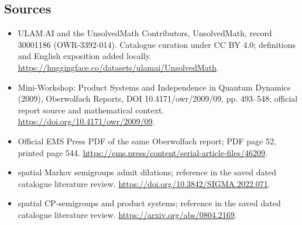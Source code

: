 \documentclass[11pt]{article}
\begin{document}
\subsection{Sources}
\begin{itemize}
\item[\hypertarget{source:30001186:1}{S1}] ULAM.AI and the UnsolvedMath Contributors, UnsolvedMath, record 30001186 (OWR-3392-014). Catalogue curation under CC BY 4.0; definitions and English exposition added locally.
\url{https://huggingface.co/datasets/ulamai/UnsolvedMath}.
\item[\hypertarget{source:30001186:2}{S2}] Mini-Workshop: Product Systems and Independence in Quantum Dynamics (2009), Oberwolfach Reports, DOI 10.4171/owr/2009/09, pp. 493--548; official report source and mathematical context.
\url{https://doi.org/10.4171/owr/2009/09}.
\item[\hypertarget{source:30001186:3}{S3}] Official EMS Press PDF of the same Oberwolfach report; PDF page 52, printed page 544.
\url{https://ems.press/content/serial-article-files/46209}.
\item[\hypertarget{source:30001186:4}{S4}] spatial Markov semigroups admit dilations; reference in the saved dated catalogue literature review.
\url{https://doi.org/10.3842/SIGMA.2022.071}.
\item[\hypertarget{source:30001186:5}{S5}] spatial CP-semigroups and product systems; reference in the saved dated catalogue literature review.
\url{https://arxiv.org/abs/0804.2169}.
\end{itemize}
\label{end:30001186}
\end{document}
